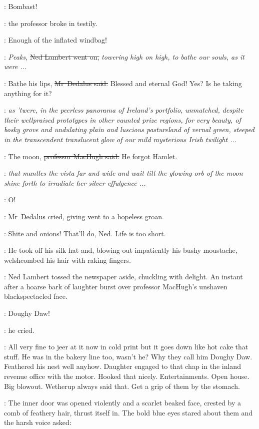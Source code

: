 \machugh:
Bombast!

:
the professor broke in testily.

\machugh:
Enough of the inflated windbag!

\lambert:
\emph{Peaks,}
\sout{Ned Lambert went on,}
\emph{towering high on high,
to bathe our souls,
as it were ...}

\simon:
Bathe his lips,
\sout{Mr~Dedalus said.}
Blessed and eternal God!
Yes?
Is he taking anything for it?

\lambert:
\emph{as 'twere,
in the peerless panorama of Ireland's portfolio,
unmatched,
despite their wellpraised prototypes in other vaunted prize regions,
for very beauty,
of bosky grove and undulating plain and luscious pastureland of vernal green,
steeped in the transcendent translucent glow
of our mild mysterious Irish twilight ...}



\machugh:
The moon,
\sout{professor MacHugh said.}
He forgot Hamlet.

\lambert:
\emph{that mantles the vista far and wide
and wait till the glowing orb of the moon shine forth
to irradiate her silver effulgence ...}

\simon:
O!

:
Mr~Dedalus cried,
giving vent to a hopeless groan.

\simon:
Shite and onions!
That'll do, Ned.
Life is too short.

:
He took off his silk hat
and, blowing out impatiently his bushy moustache,
welshcombed his hair with raking fingers.

:
Ned Lambert tossed the newspaper aside,
chuckling with delight.
An instant after a hoarse bark of laughter
burst over professor MacHugh's unshaven blackspectacled face.

\machugh:
Doughy Daw!

:
he cried.



\BloomInt:
All very fine to jeer at it now in cold print
but it goes down like hot cake that stuff.
He was in the bakery line too, wasn't he?
Why they call him Doughy Daw.
Feathered his nest well anyhow.
Daughter engaged to that chap in the inland revenue office with the motor.
Hooked that nicely.
Entertainments.
Open house.
Big blowout.
Wetherup always said that.
Get a grip of them by the stomach.

:
The inner door was opened violently
and a scarlet beaked face,
crested by a comb of feathery hair,
thrust itself in.
The bold blue eyes stared about them
and the harsh voice asked:

